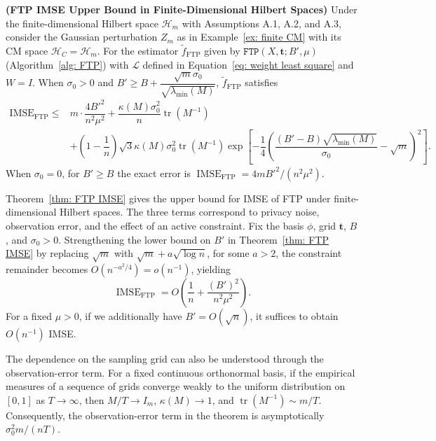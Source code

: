 \documentclass[twoside,11pt]{article}
\newcommand{\Bra}[1]{\left({#1}\right)} %
\newcommand{\SqBra}[1]{\left[{#1}\right]} %
\begin{document}
\begin{theorem}\textup{\textbf{(FTP IMSE Upper Bound in Finite-Dimensional Hilbert Spaces)}}
    Under the finite-dimensional Hilbert space $\mathcal H_m$ with Assumptions A.1, A.2, and A.3, consider the Gaussian perturbation $Z_m$ as in Example~\ref{ex: finite CM} with its CM space $\mathcal H_C=\mathcal H_m$. For the estimator $\widetilde{f}_{\mathrm{FTP}}$ given by $\mathtt{FTP}(X, \mathbf{t}; B',\mu)$ (Algorithm~\ref{alg: FTP}) with $\mathcal{L}$ defined in Equation~\eqref{eq: weight least square} and $W = I$. When $\sigma_0>0$ and $B' \geq B + \dfrac{\sqrt{m}\sigma_0}{\sqrt{\lambda_{\min}(M)}}$, $\widetilde{f}_{\mathrm{FTP}}$ satisfies 
    \begin{equation}
        \begin{aligned}
            \mathrm{IMSE}_{\mathrm{FTP}}
            \le& m\cdot\dfrac{4B'^2}{n^2\mu^2} + 
            \dfrac{\kappa(M)\sigma_0^2}{n}
            \operatorname{tr}
            (M^{-1})\\
            &+
            \Bra{1-\dfrac{1}{n}}
            \sqrt{3}\kappa(M)\sigma_0^2\operatorname{tr}
            (M^{-1})
            \exp
            \SqBra{
            -\dfrac{1}{4}\Bra{
            \dfrac{(B'-B)\sqrt{\lambda_{\min}(M)}}{\sigma_0}-\sqrt{m}
            }^2
            }.
        \end{aligned}
    \end{equation}
    When $\sigma_0=0$, for $B'\ge B$ the exact error is $\operatorname{IMSE}_{\mathrm{FTP}}=4mB'^2/(n^2\mu^2)$.
    \label{thm: FTP IMSE}
\end{theorem}
Theorem~\ref{thm: FTP IMSE} gives the upper bound for IMSE of FTP under finite-dimensional Hilbert spaces. The three terms correspond to privacy noise, observation error, and the effect of an active constraint. Fix the basis $\phi$, grid $\mathbf{t}$, $B$, and $\sigma_0>0$. Strengthening the lower bound on $B'$ in
Theorem~\ref{thm: FTP IMSE} by replacing $\sqrt m$ with $\sqrt m+a\sqrt{\log n}$, for some $a>2$, the constraint remainder becomes $O(n^{-a^2/4})=o(n^{-1})$, yielding
\[
\operatorname{IMSE}_{\mathrm{FTP}}
=
O\!\left(\frac1n+\frac{(B')^2}{n^2\mu^2}\right).
\]
For a fixed $\mu>0$, if we additionally have $B'=O(\sqrt n)$, it suffices to obtain $O(n^{-1})$ IMSE. 

The dependence on the sampling grid can also be understood through the observation-error term. For a fixed continuous orthonormal basis, if the empirical measures of a sequence of grids converge weakly to the uniform distribution on $[0,1]$ as $T\to\infty$, then $M/T\to I_m$, $\kappa(M)\to1$, and $\operatorname{tr}(M^{-1})\sim m/T$. Consequently, the observation-error term in the theorem is asymptotically $\sigma_0^2m/(nT)$.
\end{document}
